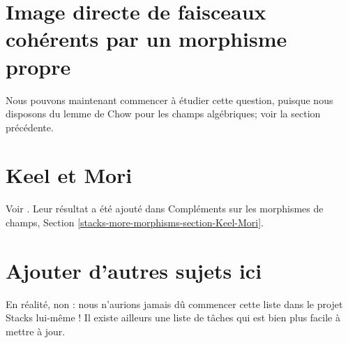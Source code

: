 \section{Image directe de faisceaux cohérents par un morphisme propre}
\label{section-proper-pushforward}

\noindent
Nous pouvons maintenant commencer à étudier cette question, puisque nous disposons du lemme de Chow pour
les champs algébriques; voir la section précédente.


\section{Keel et Mori}
\label{section-keel-mori}

\noindent
Voir \cite{K-M}. Leur résultat a été ajouté dans
Compléments sur les morphismes de champs, Section
\ref{stacks-more-morphisms-section-Keel-Mori}.


\section{Ajouter d'autres sujets ici}
\label{section-add-more}

\noindent
En réalité, non : nous n'aurions jamais dû commencer cette liste dans le
projet Stacks lui-même ! Il existe ailleurs une liste de tâches
qui est bien plus facile à mettre à jour.









